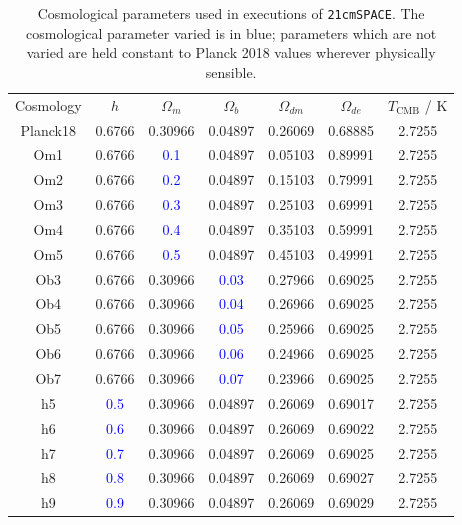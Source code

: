 \documentclass[floats,floatfix,showpacs,amssymb,prd,superscriptaddress,nofootinbib, 11pt]{revtex4-2} %
\newcommand{\code}{\texttt}
\newcommand{\blue}{\textcolor{blue}}
\begin{document}
\begin{table}[H]
\centering
\begin{tabular}{c c c c c c c}
\hline
Cosmology & $h$ & $\Omega_m$ & $\Omega_b$ & $\Omega_{dm}$ & $\Omega_{de}$ & $T_{\text{CMB}}$ / K \\
\hhline{= = = = = = =}
Planck18 & 0.6766 & 0.30966 & 0.04897 & 0.26069 & 0.68885 & 2.7255 \\ \hline
Om1 & 0.6766 & \blue{0.1} & 0.04897 & 0.05103 & 0.89991 & 2.7255 \\
Om2 & 0.6766 & \blue{0.2} & 0.04897 & 0.15103 & 0.79991 & 2.7255 \\
Om3 & 0.6766 & \blue{0.3} & 0.04897 & 0.25103 & 0.69991 & 2.7255 \\
Om4 & 0.6766 & \blue{0.4} & 0.04897 & 0.35103 & 0.59991 & 2.7255 \\
Om5 & 0.6766 & \blue{0.5} & 0.04897 & 0.45103 & 0.49991 & 2.7255 \\ \hline
Ob3 & 0.6766 & 0.30966 & \blue{0.03} & 0.27966 & 0.69025 & 2.7255 \\
Ob4 & 0.6766 & 0.30966 & \blue{0.04} & 0.26966 & 0.69025 & 2.7255 \\
Ob5 & 0.6766 & 0.30966 & \blue{0.05} & 0.25966 & 0.69025 & 2.7255 \\
Ob6 & 0.6766 & 0.30966 & \blue{0.06} & 0.24966 & 0.69025 & 2.7255 \\
Ob7 & 0.6766 & 0.30966 & \blue{0.07} & 0.23966 & 0.69025 & 2.7255 \\
\hline
h5 & \blue{0.5} & 0.30966 & 0.04897 & 0.26069 & 0.69017 & 2.7255 \\
h6 & \blue{0.6} & 0.30966 & 0.04897 & 0.26069 & 0.69022 & 2.7255 \\
h7 & \blue{0.7} & 0.30966 & 0.04897 & 0.26069 & 0.69025 & 2.7255 \\
h8 & \blue{0.8} & 0.30966 & 0.04897 & 0.26069 & 0.69027 & 2.7255 \\
h9 & \blue{0.9} & 0.30966 & 0.04897 & 0.26069 & 0.69029 & 2.7255 \\
\hline

\end{tabular}
\caption{Cosmological parameters used in executions of \code{21cmSPACE}. The cosmological parameter varied is in blue; parameters which are not varied are held constant to Planck 2018 values \citep{Planck2018results} wherever physically sensible.}
\label{tab:ic_parameter_values}
\end{table}
\end{document}
